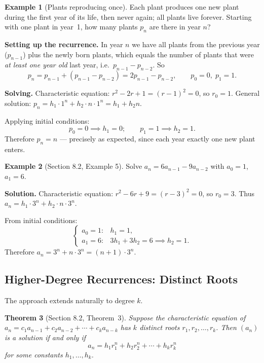 \documentclass[11pt, a4paper, notitlepage]{report}
\newtheorem{theorem}{Theorem}[section]
\theoremstyle{definition}
\newtheorem{example}[theorem]{Example}
\theoremstyle{remark}
\begin{document}
\begin{example}[Plants reproducing once]
\label{ex:plants}
Each plant produces one new plant during the first year of its life, then never again; all
plants live forever.  Starting with one plant in year~1, how many plants $p_n$ are there in
year $n$?

\textbf{Setting up the recurrence.}  In year $n$ we have all plants from the previous year
($p_{n-1}$) plus the newly born plants, which equals the number of plants that were
\emph{at least one year old} last year, i.e.\ $p_{n-1} - p_{n-2}$.  So
\[
  p_n = p_{n-1} + (p_{n-1} - p_{n-2}) = 2p_{n-1} - p_{n-2},
  \qquad p_0 = 0,\; p_1 = 1.
\]

\textbf{Solving.}  Characteristic equation: $r^2 - 2r + 1 = (r-1)^2 = 0$, so $r_0 = 1$.
General solution: $p_n = h_1 \cdot 1^n + h_2 \cdot n \cdot 1^n = h_1 + h_2 n$.

Applying initial conditions:
\[
  p_0 = 0 \implies h_1 = 0; \qquad p_1 = 1 \implies h_2 = 1.
\]
Therefore $\boxed{p_n = n}$ — precisely as expected, since each year exactly one new plant
enters.
\end{example}

\begin{example}[Section 8.2, Example 5]
\label{ex:sec82-ex5}
Solve $a_n = 6a_{n-1} - 9a_{n-2}$ with $a_0 = 1$, $a_1 = 6$.

\textbf{Solution.}  Characteristic equation: $r^2 - 6r + 9 = (r-3)^2 = 0$, so $r_0 = 3$.
Thus $a_n = h_1 \cdot 3^n + h_2 \cdot n \cdot 3^n$.

From initial conditions:
\[
  \begin{cases} a_0 = 1: & h_1 = 1, \\ a_1 = 6: & 3h_1 + 3h_2 = 6 \implies h_2 = 1. \end{cases}
\]
Therefore $a_n = 3^n + n \cdot 3^n = \boxed{(n+1) \cdot 3^n}$.
\end{example}

\subsection{Higher-Degree Recurrences: Distinct Roots}
\label{subsec:highdeg-distinct}

The approach extends naturally to degree $k$.

\begin{theorem}[Section 8.2, Theorem~3]
\label{thm:degk-distinct}
Suppose the characteristic equation of
$a_n = c_1 a_{n-1} + c_2 a_{n-2} + \cdots + c_k a_{n-k}$
has $k$ distinct roots $r_1, r_2, \ldots, r_k$.  Then $(a_n)$ is a solution if and only if
\[
  a_n = h_1 r_1^n + h_2 r_2^n + \cdots + h_k r_k^n
\]
for some constants $h_1, \ldots, h_k$.
\end{theorem}
\end{document}
